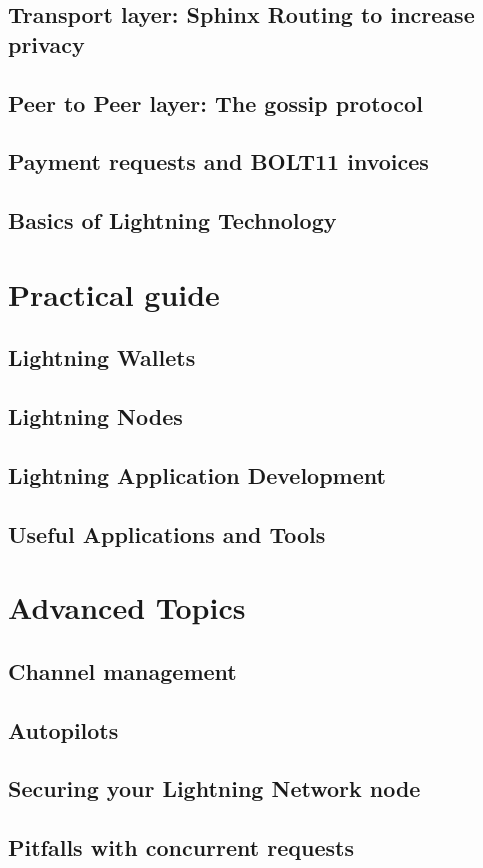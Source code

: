 \documentclass[ebook,12pt,oneside,openany]{memoir}
\begin{document}
\section{Transport layer: Sphinx Routing to increase privacy}
\section{Peer to Peer layer: The gossip protocol}
\section{Payment requests and BOLT11 invoices}
\section{Basics of Lightning Technology}
\chapter{Practical guide}
\section{Lightning Wallets}
\section{Lightning Nodes}
\section{Lightning Application Development}
\section{Useful Applications and Tools}
\chapter{Advanced Topics}
\section{Channel management}
\section{Autopilots}
\section{Securing your Lightning Network node}
\section{Pitfalls with concurrent requests}
\end{document}
